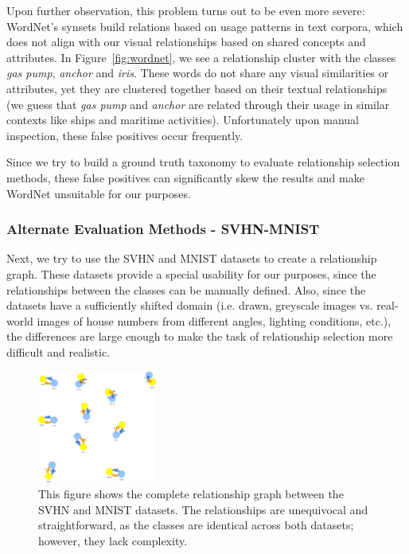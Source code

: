 Upon further observation, this problem turns out to be even more severe:
WordNet's synsets build relations based on usage patterns in text corpora,
which does not align with our visual relationships based on shared concepts and attributes.
In Figure~\ref{fig:wordnet}, we see a relationship cluster with the classes \textit{gas pump}, \textit{anchor} and \textit{iris}.
These words do not share any visual similarities or attributes, yet they are clustered together based on their textual relationships
(we guess that \textit{gas pump} and \textit{anchor} are related through their usage in similar contexts like ships and maritime activities).
Unfortunately upon manual inspection, these false positives occur frequently.

Since we try to build a ground truth taxonomy to evaluate relationship selection methods,
these false positives can significantly skew the results and make WordNet unsuitable for our purposes.

\subsubsection{Alternate Evaluation Methods - SVHN-MNIST}

Next, we try to use the SVHN and MNIST datasets to create a relationship graph.
These datasets provide a special usability for our purposes,
since the relationships between the classes can be manually defined.
Also, since the datasets have a sufficiently shifted domain (i.e. drawn, greyscale images vs. real-world images of house numbers
from different angles, lighting conditions, etc.),
the differences are large enough to make the task of relationship selection more difficult and realistic.

\begin{figure}[ht]
      \centering
      \includegraphics[width=0.35\textwidth]{figures/svhn_mnist.png}

      \caption{This figure shows the complete relationship graph between the SVHN and MNIST datasets.
            The relationships are unequivocal and straightforward, as the classes are identical across both datasets;
            however, they lack complexity.}
      \label{fig:svhn_mnist}
\end{figure}

